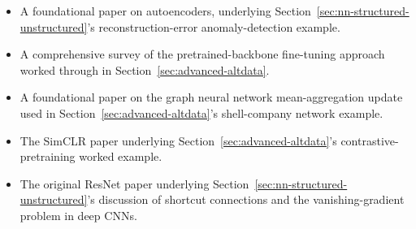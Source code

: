 \documentclass[../ai_in_finance]{subfiles}
\begin{document}
\begin{itemize}
    \item {} A foundational paper on autoencoders, underlying Section~\ref{sec:nn-structured-unstructured}'s reconstruction-error anomaly-detection example.
    \item {} A comprehensive survey of the pretrained-backbone fine-tuning approach worked through in Section~\ref{sec:advanced-altdata}.
    \item {} A foundational paper on the graph neural network mean-aggregation update used in Section~\ref{sec:advanced-altdata}'s shell-company network example.
    \item {} The SimCLR paper underlying Section~\ref{sec:advanced-altdata}'s contrastive-pretraining worked example.
    \item {} The original ResNet paper underlying Section~\ref{sec:nn-structured-unstructured}'s discussion of shortcut connections and the vanishing-gradient problem in deep CNNs.
\end{itemize}
\end{document}
